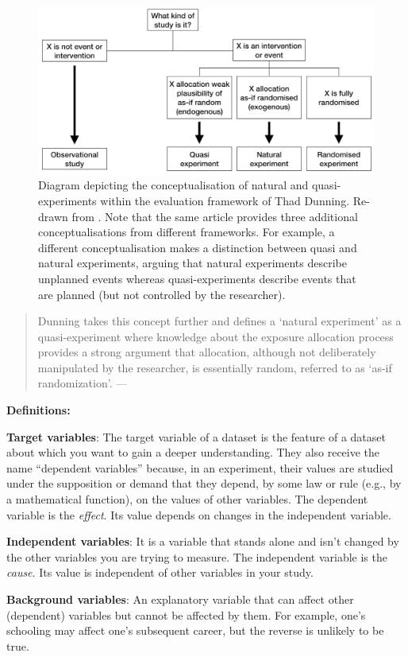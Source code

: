 \documentclass[
]{book}
\begin{document}
\begin{figure}

{\centering \includegraphics[width=1\linewidth]{Figures/natural-experiments} 

}

\caption{Diagram depicting the conceptualisation of natural and quasi-experiments within the evaluation framework of Thad Dunning. Re-drawn from \citep{de2021conceptualising}. Note that the same article provides three additional conceptualisations from different frameworks. For example, a different conceptualisation makes a distinction between quasi and natural experiments, arguing that natural experiments describe unplanned events whereas quasi-experiments describe events that are planned (but not controlled by the researcher).}\label{fig:diagram-experiments}
\end{figure}

\begin{quote}
Dunning takes this concept further and defines a `natural experiment' as a quasi-experiment where knowledge about the exposure allocation process provides a strong argument that allocation, although not deliberately manipulated by the researcher, is essentially random, referred to as `as-if randomization'. --- \citep{de2021conceptualising}
\end{quote}

\begin{tipbox}

\textbf{Definitions:}

\textbf{Target variables}: The target variable of a dataset is the feature of a dataset about which you want to gain a deeper understanding. They also receive the name ``dependent variables'' because, in an experiment, their values are studied under the supposition or demand that they depend, by some law or rule (e.g., by a mathematical function), on the values of other variables. The dependent variable is the \emph{effect}. Its value depends on changes in the independent variable.

\textbf{Independent variables}: It is a variable that stands alone and isn't changed by the other variables you are trying to measure. The independent variable is the \emph{cause}. Its value is independent of other variables in your study.

\textbf{Background variables}: An explanatory variable that can affect other (dependent) variables but cannot be affected by them. For example, one's schooling may affect one's subsequent career, but the reverse is unlikely to be true.

\end{tipbox}
\end{document}
